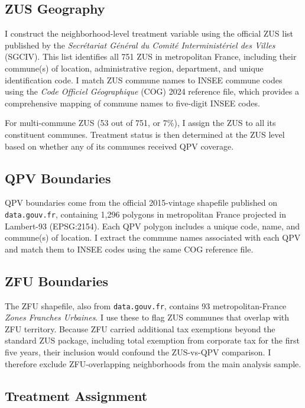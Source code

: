 \documentclass[12pt]{article}
\begin{document}
\subsection{ZUS Geography}

I construct the neighborhood-level treatment variable using the official ZUS list published by the \textit{Secr\'etariat G\'en\'eral du Comit\'e Interminist\'eriel des Villes} (SGCIV). This list identifies all 751 ZUS in metropolitan France, including their commune(s) of location, administrative region, department, and unique identification code. I match ZUS commune names to INSEE commune codes using the \textit{Code Officiel G\'eographique} (COG) 2024 reference file, which provides a comprehensive mapping of commune names to five-digit INSEE codes.

For multi-commune ZUS (53 out of 751, or 7\%), I assign the ZUS to all its constituent communes. Treatment status is then determined at the ZUS level based on whether any of its communes received QPV coverage.

\subsection{QPV Boundaries}

QPV boundaries come from the official 2015-vintage shapefile published on \texttt{data.gouv.fr}, containing 1,296 polygons in metropolitan France projected in Lambert-93 (EPSG:2154). Each QPV polygon includes a unique code, name, and commune(s) of location. I extract the commune names associated with each QPV and match them to INSEE codes using the same COG reference file.

\subsection{ZFU Boundaries}

The ZFU shapefile, also from \texttt{data.gouv.fr}, contains 93 metropolitan-France \textit{Zones Franches Urbaines}. I use these to flag ZUS communes that overlap with ZFU territory. Because ZFU carried additional tax exemptions beyond the standard ZUS package, including total exemption from corporate tax for the first five years, their inclusion would confound the ZUS-vs-QPV comparison. I therefore exclude ZFU-overlapping neighborhoods from the main analysis sample.

\subsection{Treatment Assignment}
\end{document}
